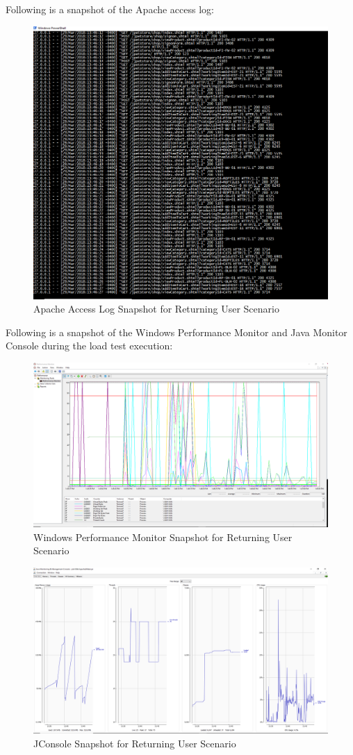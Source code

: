 \documentclass[fontsize=12pt,paper=letter,twoside]{scrartcl}
\begin{document}
\bigskip
\noindent Following is a snapshot of the Apache access log:
\begin{figure}[!htb]
\begin{center}
\includegraphics[width=.6\textwidth]{../../load-test/test-plans/returning-user/access-log.png}
\end{center}
\caption{Apache Access Log Snapshot for Returning User Scenario}
\label{fig:ruser:access_log}
\end{figure}

\clearpage
\bigskip
\noindent Following is a snapshot of the Windows Performance Monitor and Java Monitor Console during the load test execution:

\begin{figure}[!htb]
\begin{center}
\includegraphics[width=.7\textwidth]{../../load-test/test-plans/returning-user/perfmon-ru.png}
\end{center}
\caption{Windows Performance Monitor Snapshot for Returning User Scenario}
\label{fig:ruser:perfmon}
\end{figure}

\begin{figure}[!htb]
\begin{center}
\includegraphics[width=.7\textwidth]{../../load-test/test-plans/returning-user/jconsole-ru.png}
\end{center}
\caption{JConsole Snapshot for Returning User Scenario}
\label{fig:ruser:jconsole}
\end{figure}
\end{document}
